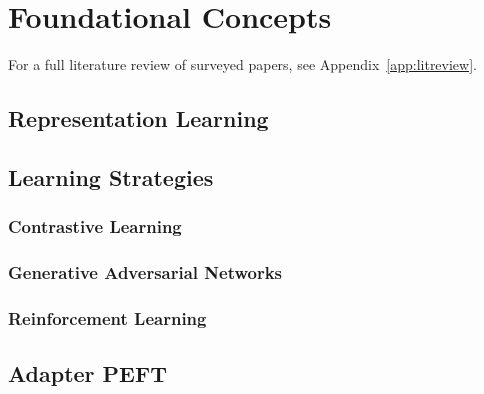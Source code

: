 \documentclass[12pt, a4paper]{article}
\begin{document}
\section{Foundational Concepts}
\label{sec:foundations}

For a full literature review of surveyed papers, see Appendix~\ref{app:litreview}.


\subsection{Representation Learning}

\subsection{Learning Strategies}

\subsubsection{Contrastive Learning}

\subsubsection{Generative Adversarial Networks}

\subsubsection{Reinforcement Learning}

\subsection{Adapter PEFT}
\end{document}
